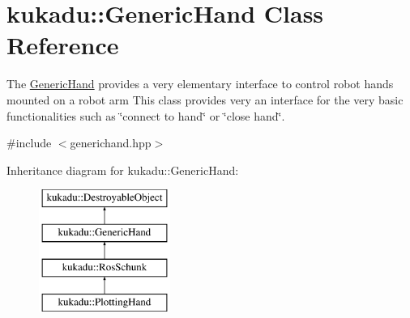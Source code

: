 \hypertarget{classkukadu_1_1GenericHand}{\section{kukadu\-:\-:Generic\-Hand Class Reference}
\label{classkukadu_1_1GenericHand}
}


The \hyperlink{classkukadu_1_1GenericHand}{Generic\-Hand} provides a very elementary interface to control robot hands mounted on a robot arm This class provides very an interface for the very basic functionalities such as \char`\"{}connect to hand\char`\"{} or \char`\"{}close hand\char`\"{}.  




{\ttfamily \#include $<$generichand.\-hpp$>$}

Inheritance diagram for kukadu\-:\-:Generic\-Hand\-:\begin{figure}[H]
\begin{center}
\leavevmode
\includegraphics[height=4.000000cm]{classkukadu_1_1GenericHand}
\end{center}
\end{figure}
